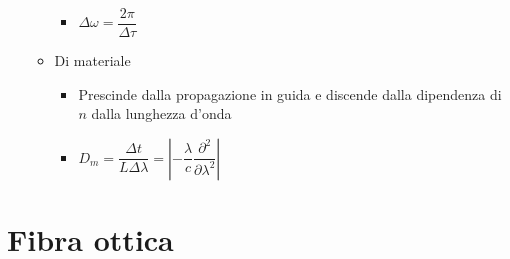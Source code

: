 \documentclass{article}
\begin{document}
\begin{itemize}
\begin{itemize}
\begin{itemize}
                  \item \( \Delta \omega = \dfrac{2 \pi}{\Delta \tau} \)
                \end{itemize}
          \item Di materiale
                \begin{itemize}
                  \item Prescinde dalla propagazione in guida e discende dalla dipendenza di \(n\) dalla lunghezza d'onda
                  \item \( D_m = \dfrac{\Delta t}{L \Delta \lambda} = \left| -\dfrac{\lambda}{c} \dfrac{\partial ^ 2}{\partial \lambda ^ 2} \right| \)
                \end{itemize}
        \end{itemize}
\end{itemize}

\newpage

\section{Fibra ottica}
\end{document}
